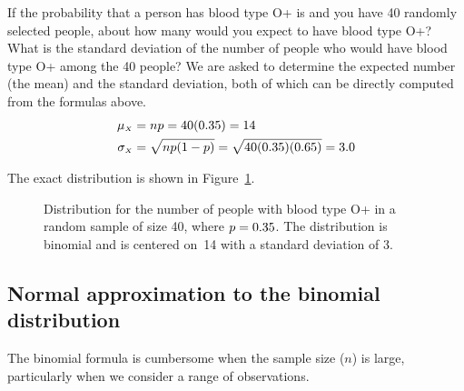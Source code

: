 \begin{examplewrap}
\begin{nexample}{If the probability that a person has blood type O+ is \oposprob{} and you have 40 randomly selected people, about how many would you expect to have blood type O+? What is the standard deviation of the number of people who would have blood type O+ among the 40 people?}
We are asked to determine the expected number (the mean) and the standard deviation, both of which can be directly computed from the formulas above. 
 \begin{align*}
\mu_{\scriptscriptstyle{X}}&=np = 40(0.35{}) = 14 \\
 \sigma_{\scriptscriptstyle{X}} &= \sqrt{np(1-p)} = \sqrt{40(0.35{})(0.65{})} = 3.0
\end{align*}%
\end{nexample}
\end{examplewrap}

The exact distribution is shown in Figure~\ref{oPositive40}.

\begin{figure}[ht]
\centering
{}
\caption{Distribution for the number of people with blood type O+ in a random sample of size 40, where $p=0.35{}$.  The distribution is binomial and is centered on~14 with a standard deviation of 3.  }
\label{oPositive40}
\end{figure}






\D{\newpage}
\subsection{Normal approximation to the binomial distribution}


The binomial formula is cumbersome when the sample size ($n$) is large, particularly when we consider a range of observations.

